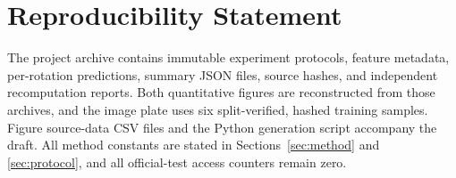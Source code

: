 \documentclass[10pt,twocolumn]{article}
\begin{document}
\section*{Reproducibility Statement}

The project archive contains immutable experiment protocols, feature metadata,
per-rotation predictions, summary JSON files, source hashes, and independent
recomputation reports. Both quantitative figures are reconstructed from those
archives, and the image plate uses six split-verified, hashed training samples.
Figure source-data CSV files and the Python generation script accompany the
draft. All method constants are stated in Sections~\ref{sec:method} and
\ref{sec:protocol}, and all official-test access counters remain zero.


{\fontsize{7.5pt}{8.5pt}\selectfont}
\end{document}
